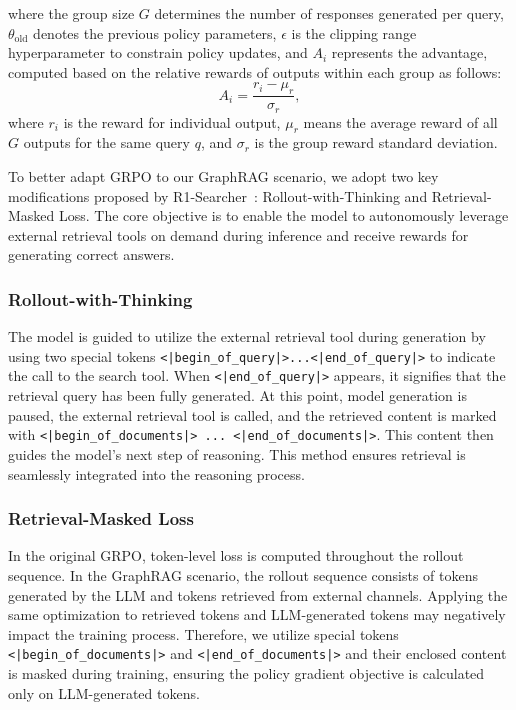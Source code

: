 where the group size $G$ determines the number of responses generated per query, $\theta_{\text{old}}$ denotes the previous policy parameters, $\epsilon$ is the clipping range hyperparameter to constrain policy updates, and $A_{i}$ represents the advantage, computed based on the relative rewards of outputs within each group as follows:
\begin{equation}\label{eq:advantage}
A_{i} = \frac{r_i - \mu_r}{\sigma_r},   
\end{equation}
where $r_i$ is the reward for individual output, $\mu_r$ means the average reward of all $G$ outputs for the same query $q$, and $\sigma_r$ is the group reward standard deviation. %

To better adapt GRPO to our GraphRAG scenario, we adopt two key modifications proposed by R1-Searcher~\cite{song2025r1searcher}: Rollout-with-Thinking and Retrieval-Masked Loss. The core objective is to enable the model to autonomously leverage external retrieval tools on demand during inference and receive rewards for generating correct answers. %

\subsubsection{Rollout-with-Thinking} 
The model is guided to utilize the external retrieval tool during generation by using two special tokens \texttt{<|begin\_of\_query|>...<|end\_of\_query|>} to indicate the call to the search tool. 
When \texttt{<|end\_of\_query|>} appears, it signifies that the retrieval query has been fully generated. 
At this point, model generation is paused, the external retrieval tool is called, and the retrieved content is marked with \texttt{<|begin\_of\_documents|> ... <|end\_of\_documents|>}. 
This content then guides the model's next step of reasoning. 
This method ensures retrieval is seamlessly integrated into the reasoning process.

\subsubsection{Retrieval-Masked Loss}
In the original GRPO, token-level loss is computed throughout the rollout sequence. In the GraphRAG scenario, the rollout sequence consists of tokens generated by the LLM and tokens retrieved from external channels. 
Applying the same optimization to retrieved tokens and LLM-generated tokens may negatively impact the training process. Therefore, we utilize special tokens \texttt{<|begin\_of\_documents|>} and \texttt{<|end\_of\_documents|>} and their enclosed content is masked during training, ensuring the policy gradient objective is calculated only on LLM-generated tokens. 

